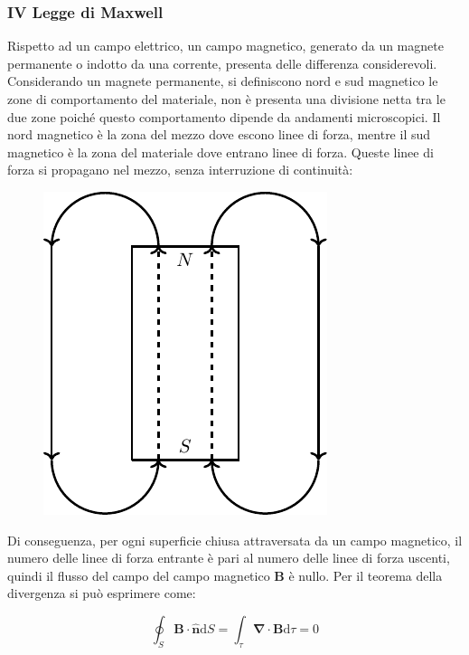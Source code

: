 \documentclass{article}
\newcommand{\vect}[1]{\boldsymbol{\mathbf{#1}}}
\newcommand{\df}{\mathrm{d}}
\numberwithin{equation}{subsection}
\begin{document}
\subsubsection{IV Legge di Maxwell}

Rispetto ad un campo elettrico, un campo magnetico, generato da un magnete permanente o indotto da una corrente, presenta delle differenza considerevoli. Considerando un 
magnete permanente, si definiscono nord e sud magnetico le zone di comportamento del materiale, non è presenta una divisione netta tra le due zone poiché questo comportamento 
dipende da andamenti microscopici. Il nord magnetico è la zona del mezzo dove escono linee di forza, mentre il 
sud magnetico è la zona del materiale dove entrano linee di forza. Queste linee di forza si propagano nel mezzo, senza interruzione di continuità:

\begin{figure}[H]%
    \centering
    \includegraphics{quarta-legge-maxwell.pdf}%
    \label{fig:quarta-legge-maxwell}
\end{figure}

Di conseguenza, per ogni superficie chiusa attraversata da un campo magnetico, il numero delle linee di forza entrante è pari al numero delle linee di forza uscenti, quindi 
il flusso del campo del campo magnetico $\vect{B}$ è nullo. Per il teorema della divergenza si può esprimere come:

\begin{equation}
    \displaystyle\oint_{S}\vect{B}\cdot\hat{\vect{n}}\df S=\int_{\tau}\vect\nabla\cdot\vect{B}\df\tau=0
\end{equation}
\end{document}
